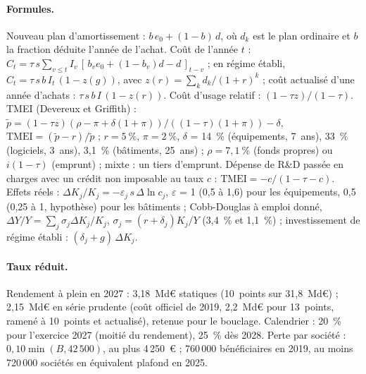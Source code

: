 \paragraph{Formules.} Nouveau plan d'amortissement : $b\,e_0 + (1-b)\,d$, où $d_k$ est le plan ordinaire et $b$ la
fraction déduite l'année de l'achat. Coût de l'année $t$ : $C_t = \tau\, s \sum_{v\le t} I_v\,[\,b_v e_0 + (1-b_v) d - d\,]_{t-v}$ ;
en régime établi, $C_t = \tau\, s\, b\, I_t\,(1 - z(g))$, avec $z(r)=\sum_k d_k/(1+r)^k$ ; coût actualisé d'une année
d'achats : $\tau\, s\, b\, I\,(1-z(r))$. Coût d'usage relatif : $(1-\tau z)/(1-\tau)$. TMEI (Devereux et Griffith) :
$\tilde p = (1-\tau z)(\rho-\pi+\delta(1+\pi))/((1-\tau)(1+\pi)) - \delta$, $\mathrm{TMEI} = (\tilde p - r)/\tilde p$ ; $r = 5~\%$,
$\pi = 2~\%$, $\delta$ = 14~\% (équipements, 7~ans), 33~\% (logiciels, 3~ans), 3,1~\% (bâtiments, 25~ans) ; $\rho = 7{,}1~\%$
(fonds propres) ou $i(1-\tau)$ (emprunt) ; mixte : un tiers d'emprunt. Dépense de R\&D passée en charges avec un crédit
non imposable au taux $c$ : $\mathrm{TMEI} = -c/(1-\tau-c)$. Effets réels : $\Delta K_j/K_j = -\varepsilon_j\, s\, \Delta\ln c_j$,
$\varepsilon$ = 1 (0,5 à 1,6) pour les équipements, 0,5 (0,25 à 1, hypothèse) pour les bâtiments ; Cobb-Douglas à emploi
donné, $\Delta Y/Y = \sum_j \sigma_j \Delta K_j/K_j$, $\sigma_j = (r+\delta_j)K_j/Y$ (3,4~\% et 1,1~\%) ; investissement de
régime établi : $(\delta_j + g)\,\Delta K_j$.

\paragraph{Taux réduit.} Rendement à plein en 2027 : 3,18~Md€ statiques (10~points sur 31,8~Md€) ; 2,15~Md€ en série
prudente (coût officiel de 2019, 2,2~Md€ pour 13~points, ramené à 10~points et actualisé), retenue pour le bouclage.
Calendrier : 20~\% pour l'exercice 2027 (moitié du rendement), 25~\% dès 2028. Perte par société : $0{,}10\min(B,
42\,500)$, au plus 4\,250~€ ; 760\,000 bénéficiaires en 2019, au moins 720\,000 sociétés en équivalent plafond en 2025.

